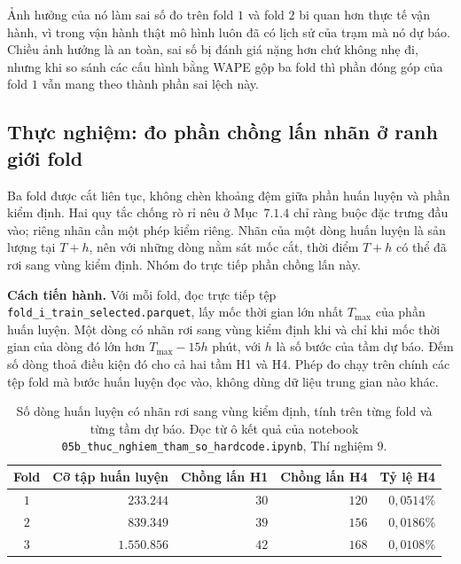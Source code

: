 \documentclass[12pt, a4paper]{report}
\begin{document}
Ảnh hưởng của nó làm sai số đo trên fold $1$ và fold $2$ bi quan hơn thực tế vận
hành, vì trong vận hành thật mô hình luôn đã có lịch sử của trạm mà nó dự báo. Chiều ảnh
hưởng là an toàn, sai số bị đánh giá nặng hơn chứ không nhẹ đi, nhưng khi so sánh các
cấu hình bằng WAPE gộp ba fold thì phần đóng góp của fold $1$ vẫn mang theo thành phần sai
lệch này.

\FloatBarrier
\subsection{Thực nghiệm: đo phần chồng lấn nhãn ở ranh giới fold}

Ba fold được cắt liên tục, không chèn khoảng đệm giữa phần huấn luyện và phần kiểm
định. Hai quy tắc chống rò rỉ nêu ở Mục~$7.1.4$ chỉ ràng buộc đặc trưng đầu
vào; riêng nhãn cần một phép kiểm riêng. Nhãn của một dòng huấn luyện là sản
lượng tại $T + h$, nên với những dòng nằm sát mốc cắt, thời điểm $T + h$ có thể đã rơi
sang vùng kiểm định. Nhóm đo trực tiếp phần chồng lấn này.

\textbf{Cách tiến hành.} Với mỗi fold, đọc trực tiếp tệp
\texttt{fold\_i\_train\_selected.parquet}, lấy mốc thời gian lớn nhất $T_{\max}$ của phần
huấn luyện. Một dòng có nhãn rơi sang vùng kiểm định khi và chỉ khi mốc thời gian của dòng đó lớn hơn
$T_{\max} - 15h$ phút, với $h$ là số bước của tầm dự báo. Đếm số dòng thoả điều kiện đó
cho cả hai tầm H1 và H4. Phép đo chạy trên chính các tệp fold mà bước huấn luyện đọc
vào, không dùng dữ liệu trung gian nào khác.

\begin{table}[htbp]
\centering
\caption{Số dòng huấn luyện có nhãn rơi sang vùng kiểm định, tính trên từng fold và
từng tầm dự báo. Đọc từ ô kết quả của notebook
\texttt{05b\_thuc\_nghiem\_tham\_so\_hardcode.ipynb}, Thí nghiệm $9$.}
\label{tab:chong_lan}
\small
\begin{tabular}{c r r r r}
\toprule
\textbf{Fold} & \textbf{Cỡ tập huấn luyện} & \textbf{Chồng lấn H1} & \textbf{Chồng lấn H4} & \textbf{Tỷ lệ H4} \\
\midrule
$1$ & $233.244$ & $30$ & $120$ & $0{,}0514\%$ \\
$2$ & $839.349$ & $39$ & $156$ & $0{,}0186\%$ \\
$3$ & $1.550.856$ & $42$ & $168$ & $0{,}0108\%$ \\
\bottomrule
\end{tabular}
\caption[Số dòng huấn luyện có nhãn rơi sang vùng kiểm định, tính trên từng fold và từng tầm dự báo]{Số dòng huấn luyện có nhãn rơi sang vùng kiểm định, tính trên từng fold và
từng tầm dự báo. Đọc từ ô kết quả của notebook
\texttt{05b\_thuc\_nghiem\_tham\_so\_hardcode.ipynb}, Thí nghiệm $9$.}
\label{tab:chong_lan}
\end{table}
\end{document}
